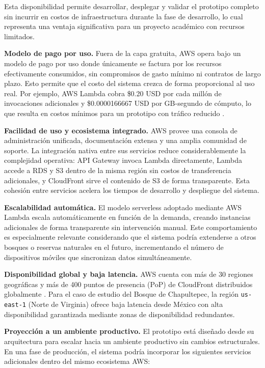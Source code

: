 Esta disponibilidad permite desarrollar, desplegar y validar el
prototipo completo sin incurrir en costos de infraestructura durante
la fase de desarrollo, lo cual representa una ventaja significativa
para un proyecto académico con recursos limitados.

\textbf{Modelo de pago por uso.} Fuera de la capa gratuita, AWS opera
bajo un modelo de pago por uso donde únicamente se factura por los
recursos efectivamente consumidos, sin compromisos de gasto mínimo
ni contratos de largo plazo. Esto permite que el costo del sistema
crezca de forma proporcional al uso real. Por ejemplo, AWS Lambda
cobra \$0.20 USD por cada millón de invocaciones adicionales y
\$0.0000166667 USD por GB-segundo de cómputo, lo que resulta en
costos mínimos para un prototipo con tráfico reducido
\cite{aws_lambda_pricing}.

\textbf{Facilidad de uso y ecosistema integrado.} AWS provee una
consola de administración unificada, documentación extensa y una
amplia comunidad de soporte. La integración nativa entre sus servicios
reduce considerablemente la complejidad operativa: API Gateway invoca
Lambda directamente, Lambda accede a RDS y S3 dentro de la misma
región sin costos de transferencia adicionales, y CloudFront sirve
el contenido de S3 de forma transparente. Esta cohesión entre servicios
acelera los tiempos de desarrollo y despliegue del sistema.

\textbf{Escalabilidad automática.} El modelo serverless adoptado
mediante AWS Lambda escala automáticamente en función de la demanda,
creando instancias adicionales de forma transparente sin intervención
manual. Este comportamiento es especialmente relevante considerando
que el sistema podría extenderse a otros bosques o reservas naturales
en el futuro, incrementando el número de dispositivos móviles que
sincronizan datos simultáneamente.

\textbf{Disponibilidad global y baja latencia.} AWS cuenta con más
de 30 regiones geográficas y más de 400 puntos de presencia (PoP)
de CloudFront distribuidos globalmente \cite{aws_cloudfront_pricing}.
Para el caso de estudio del Bosque de Chapultepec, la región
\texttt{us-east-1} (Norte de Virginia) ofrece baja latencia desde
México con alta disponibilidad garantizada mediante zonas de
disponibilidad redundantes.

\textbf{Proyección a un ambiente productivo.} El prototipo está
diseñado desde su arquitectura para escalar hacia un ambiente
productivo sin cambios estructurales. En una fase de producción,
el sistema podría incorporar los siguientes servicios adicionales
dentro del mismo ecosistema AWS:

